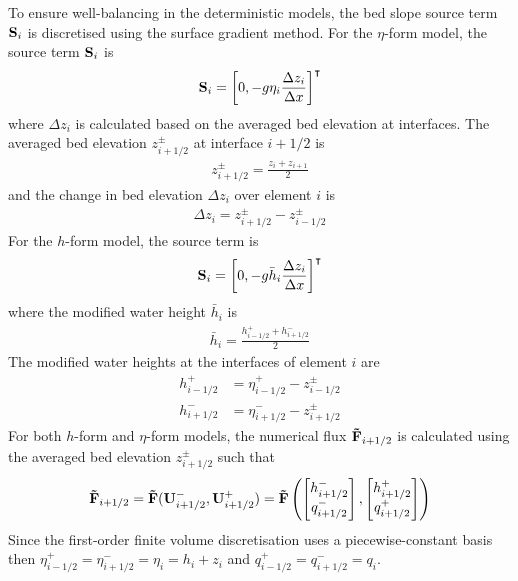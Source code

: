 To ensure well-balancing in the deterministic models, the bed slope source term $\mathbf{S}_i$ is discretised using the surface gradient method.
For the $\eta$-form model, the source term $\mathbf{S}_i$ is \citep{liang-borthwick2009}
\begin{align}
    \mathbf{S}_i = \left[ 0, -g \eta_i \frac{\Delta z_i}{\Delta x} \right]^\intercal \label{eqn:source-eta}
\end{align}
where $\Delta z_i$ is calculated based on the averaged bed elevation at interfaces.  The averaged bed elevation $z_{i+1/2}^\pm$ at interface $i+1/2$ is
\begin{align}
z_{i+1/2}^\pm = \frac{z_i + z_{i+1}}{2} \label{eqn:z-interface}
\end{align}
and the change in bed elevation $\Delta z_i$ over element $i$ is
\begin{align}
    \Delta z_i = z_{i+1/2}^\pm - z_{i-1/2}^\pm \label{eqn:delta-z}
\end{align}
For the $h$-form model, the source term is \citep{zhou2001}
\begin{align}
\mathbf{S}_i = \left[ 0, -g \bar{h}_i \frac{\Delta z_i}{\Delta x} \right]^\intercal \label{eqn:source-h}
\end{align}
where the modified water height $\bar{h}_i$ is
\begin{align}
    \bar{h}_i = \frac{h_{i-1/2}^+ + h_{i+1/2}^-}{2} \label{eqn:hbar}
\end{align}
The modified water heights at the interfaces of element $i$ are
\begin{align}
    h_{i-1/2}^+ &= \eta_{i-1/2}^+ - z_{i-1/2}^\pm \\
    h_{i+1/2}^- &= \eta_{i+1/2}^- - z_{i+1/2}^\pm
\end{align}
For both $h$-form and $\eta$-form models, the numerical flux $\mathbf{\tilde{F}}_{i+1/2}$ is calculated using the averaged bed elevation $z_{i+1/2}^\pm$ such that
\begin{align}
    \mathbf{\tilde{F}}_{i+1/2} = \mathbf{\tilde{F}}(\mathbf{U}_{i+1/2}^-, \mathbf{U}_{i+1/2}^+)
    = \mathbf{\tilde{F}}\left(
    \begin{bmatrix}
        h_{i+1/2}^- \\
        q_{i+1/2}^-
    \end{bmatrix}
    ,
     \begin{bmatrix}
        h_{i+1/2}^+ \\
        q_{i+1/2}^+
    \end{bmatrix}
    \right)
\end{align}
Since the first-order finite volume discretisation uses a piecewise-constant basis then $\eta_{i-1/2}^+ = \eta_{i+1/2}^- = \eta_i = h_i + z_i$ and $q_{i-1/2}^+ = q_{i+1/2}^- = q_i$.

